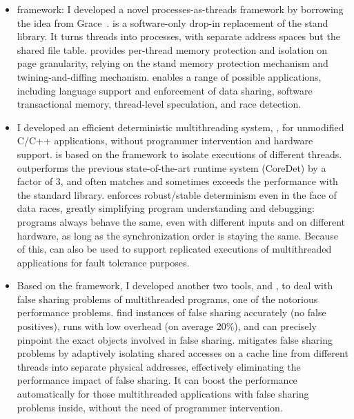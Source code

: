 \begin{itemize}
\item \Sheriff{} framework: I developed a novel processes-as-threads framework by borrowing the idea from Grace~\cite{grace}. \sheriff{} is a software-only drop-in replacement of the stand \pthreads{} library. It turns threads into processes, with separate address spaces but the shared file table. \sheriff{} provides per-thread memory protection and isolation on page granularity, relying on the stand memory protection mechanism and twining-and-diffing mechanism. \sheriff{} enables a range of possible applications, including language support and enforcement of data sharing, software transactional memory, thread-level speculation, and race detection. 

\item I developed an efficient deterministic multithreading system, \dthreads{}, for unmodified C/C++ applications,  without programmer intervention and hardware support. \dthreads{} is based on the \sheriff{} framework to isolate executions of different threads. \dthreads{} outperforms the previous state-of-the-art runtime system (CoreDet) by a factor of 3, and often matches and sometimes exceeds the performance with the standard \pthreads{} library. \Dthreads{} enforces robust/stable determinism even in the face of data races, greatly simplifying program understanding and debugging: programs always behave the same, even with different inputs and on different hardware, as long as the synchronization order is staying the same. Because of this, \dthreads{} can also be used to support replicated executions of multithreaded applications for fault tolerance purposes.

\item 
Based on the \sheriff{} framework, I developed another two tools, \SheriffDetect{} and \SheriffProtect{}, to deal with false sharing problems of multithreaded programs, one of the notorious performance problems. 
\SheriffDetect{} find instances of false sharing accurately (no false positives), runs with low overhead (on average 20\%), and can precisely pinpoint the exact objects involved in false sharing. \SheriffProtect{} mitigates false sharing problems by adaptively isolating shared accesses on a cache line from different threads into separate physical addresses, effectively eliminating the performance impact of false sharing. It can boost the performance automatically for those multithreaded applications with false sharing problems inside, without the need of programmer intervention. 


\end{itemize}
